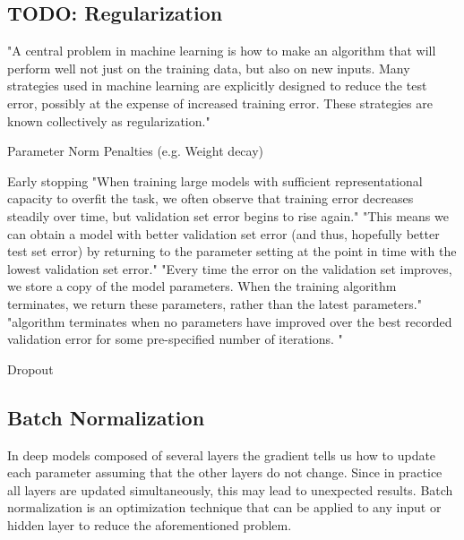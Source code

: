\subsection{TODO: Regularization}
"A central problem in machine learning is how to make an algorithm that will
perform well not just on the training data, but also on new inputs. Many strategies
used in machine learning are explicitly designed to reduce the test error, possibly
at the expense of increased training error. These strategies are known collectively
as regularization."

Parameter Norm Penalties (e.g. Weight decay)

Early stopping
"When training large models with sufficient representational capacity to overfit
the task, we often observe that training error decreases steadily over time, but
validation set error begins to rise again."
"This means we can obtain a model with better validation set error (and thus,
hopefully better test set error) by returning to the parameter setting at the point in
time with the lowest validation set error."
"Every time the error on the validation set
improves, we store a copy of the model parameters. When the training algorithm
terminates, we return these parameters, rather than the latest parameters."
"algorithm terminates when no parameters have improved over the best recorded
validation error for some pre-specified number of iterations. "

Dropout

\subsection{Batch Normalization}
In deep models composed of several layers the gradient tells us how to update each parameter assuming that the other layers do not change. Since in practice all layers are updated simultaneously, this may lead to unexpected results. Batch normalization is an optimization technique that can be applied to any input or hidden layer to reduce the aforementioned problem\cite{Goodfellow-et-al-2016}.

